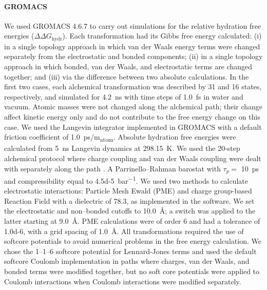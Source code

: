 \documentclass[journal=jctcce,manuscript=article]{achemso}
\begin{document}
\paragraph{GROMACS} We used GROMACS 4.6.7 to carry out simulations for 
the relative hydration free energies ($\Delta \Delta G_{\mathrm{hydr}}$).
Each transformation had its Gibbs free energy calculated: (i) in a single 
topology approach in which van der Waals energy terms were changed separately 
from the electrostatic and bonded components; (ii) in a single topology 
approach in which bonded, van der Waals, and electrostatic terms are changed 
together;  and (iii) via the difference between two absolute calculations.
In the first two cases, each alchemical transformation was described by 31 and 
16 states, respectively, and simulated for \SI{4.2}{ns} with time steps of 
\SI{1.0}{fs} in water and vacuum. Atomic masses were not changed along the 
alchemical path;
their change affect kinetic energy only and do not contribute to the free 
energy change on this case. 
We used the Langevin integrator implemented in GROMACS with a 
default friction coefficient of \SI{1.0}{ps/m_{atom}}. 
Absolute hydration free energies were calculated from \SI{5}{ns} Langevin 
dynamics
at \SI{298.15}{K}. We used the 20-step alchemical protocol where charge 
coupling and
van der Waals coupling were dealt with separately along the path 
\cite{Mobley2014, doi:10.1021/acs.jced.7b00104}.
A Parrinello--Rahman barostat with $\tau_p =$ \SI{10}{ps} and compressibility 
equal to \SI{4.5d-5}{bar^{-1}}.
We used two methods to calculate electrostatic interactions: Particle Mesh 
Ewald (PME) and charge group-based Reaction Field with a dielectric of 78.3, 
as implemented in the software. 
We set the electrostatic and non--bonded cutoffs to \SI{10.0}{\angstrom};
a switch was applied to the latter starting at \SI{9.0}{\angstrom}. 
PME calculations were of order 6 and had a 
tolerance of \num{1.0d-6}, with a grid spacing of \SI{1.0}{\angstrom}. 
All transformations required the use of softcore potentials to avoid numerical 
problems in the free energy calculation.  We chose the 1--1--6 softcore 
potential for Lennard-Jones terms and used the default softcore Coulomb 
implementation in paths where charges, van der Waals, and bonded terms were 
modified together, but no soft core potentials were applied to Coulomb 
interactions when Coulomb interactions were modified separately.
\end{document}
